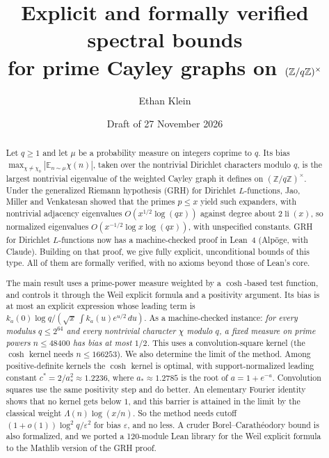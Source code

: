 \documentclass[11pt]{amsart}
\title[Explicit, verified spectral bounds for prime Cayley graphs]{Explicit and formally verified spectral bounds\\ for prime Cayley graphs on $(\Z/q\Z)^\times$}
\author{Ethan Klein}
\date{Draft of 27 November 2026}
\theoremstyle{definition}
\theoremstyle{remark}
\newcommand{\Z}{\mathbb{Z}}
\newcommand{\abs}[1]{\left\lvert #1 \right\rvert}
\begin{document}
\begin{abstract}
Let $q\ge 1$ and let $\mu$ be a probability measure on integers coprime to $q$. Its bias
$\max_{\chi\ne\chi_0}\abs{\mathbb{E}_{n\sim\mu}\chi(n)}$, taken over the nontrivial Dirichlet
characters modulo $q$, is the largest nontrivial eigenvalue of the weighted Cayley graph
it defines on $(\Z/q\Z)^\times$. Under the generalized Riemann hypothesis (GRH) for Dirichlet
$L$-functions, Jao, Miller and Venkatesan showed that the primes $p\le x$ yield such
expanders, with nontrivial adjacency eigenvalues $O(x^{1/2}\log(qx))$ against degree about $2\operatorname{li}(x)$, so
normalized eigenvalues $O(x^{-1/2}\log x\log(qx))$, with unspecified constants.
GRH for Dirichlet $L$-functions now has a machine-checked proof in Lean~4 (Alpöge, with Claude).
Building on that proof, we give fully explicit, unconditional bounds of this type. All of them are
formally verified, with no axioms beyond those of Lean's core.

The main result uses a prime-power measure weighted by a $\cosh$-based test function, and controls it
through the Weil explicit formula and a positivity argument. Its bias is at most an explicit
expression whose leading term is $k_a(0)\log q/(\sqrt{x}\,\int k_a(u)e^{u/2}\,du)$. As a
machine-checked instance: \emph{for every modulus $q\le 2^{64}$ and every nontrivial character $\chi$
modulo $q$, a fixed measure on prime powers $n\le 48400$ has bias at most $1/2$.} This uses a
convolution-square kernel (the $\cosh$ kernel needs $n\le166253$). We also determine the
limit of the method. Among positive-definite kernels the $\cosh$ kernel is optimal, with support-normalized
leading constant $c^*=2/a_*^2\approx1.2236$, where $a_*\approx1.2785$ is the root of $a=1+e^{-a}$. Convolution squares
use the same positivity step and do better. An elementary Fourier identity shows that no kernel gets below $1$, and
this barrier is attained in the limit by the classical weight $\Lambda(n)\log(x/n)$. So the method needs cutoff
$(1+o(1))\log^2q/\varepsilon^2$ for bias $\varepsilon$, and no less.
A cruder Borel--Carath\'eodory bound is also formalized, and we ported a 120-module Lean library
for the Weil explicit formula to the Mathlib version of the GRH proof.
\end{abstract}

\maketitle
\tableofcontents














\end{document}
